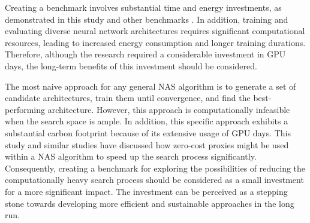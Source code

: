 Creating a benchmark involves substantial time and energy investments, as demonstrated in this study and other benchmarks \autocite{dong2020bench, ying2019bench, tu2021bench}. In addition, training and evaluating diverse neural network architectures requires significant computational resources, leading to increased energy consumption and longer training durations. Therefore, although the research required a considerable investment in \gls{GPU} days, the long-term benefits of this investment should be considered. 

The most naive approach for any general \gls{NAS} algorithm is to generate a set of candidate architectures, train them until convergence, and find the best-performing architecture. However, this approach is computationally infeasible when the search space is ample. In addition, this specific approach exhibits a substantial carbon footprint because of its extensive usage of \gls{GPU} days. This study and similar studies \autocite{abdelfattah2021zero, colin2022adeeperlook} have discussed how zero-cost proxies might be used within a \gls{NAS} algorithm to speed up the search process significantly. Consequently, creating a benchmark for exploring the possibilities of reducing the computationally heavy search process should be considered as a small investment for a more significant impact. The investment can be perceived as a stepping stone towards developing more efficient and sustainable approaches in the long run.

\begin{comment}
    
\subsection{Balancing Performance and Environmental Impact}
\begin{itemize}
    \item Acknowledge the trade-offs between performance, energy consumption, and carbon emissions
    \item Discuss the importance of considering environmental implications when developing new algorithms and techniques
\end{itemize}
\end{comment}